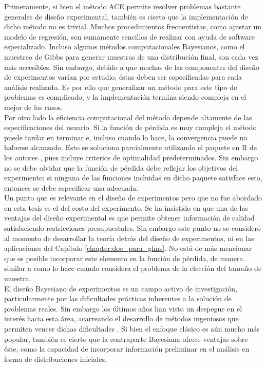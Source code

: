 Primeramente, si bien el método ACE permite resolver problemas bastante generales de diseño experimental, también es cierto que la implementación de dicho método no es trivial. Muchos procedimientos frecuentistas, como ajustar un modelo de regresión, son sumamente sencillos de realizar con ayuda de software especializado. Incluso algunos métodos computacionales Bayesianos, como el muestreo de Gibbs para generar muestras de una distribución final, son cada vez más accesibles. Sin embargo, debido a que muchas de las componentes del diseño de experimentos varían por estudio, éstas deben ser especificadas para cada análisis realizado. Es por ello que generalizar un método para este tipo de problemas es complicado, y la implementación termina siendo compleja en el mejor de los casos. \\




Por otro lado la eficiencia computacional del método depende altamente de las especificaciones del usuario. Si la función de pérdida es muy compleja el método puede tardar en terminar e, incluso cuando lo hace, la convergencia puede no haberse alcanzado. Esto se soluciona parcialmente utilizando el paquete en \textsf{R} de los autores \citep{acebayes}, pues incluye criterios de optimalidad predeterminados. Sin embargo no se debe olvidar que la función de pérdida debe reflejar los objetivos del experimento; si ninguna de las funciones incluidas en dicho paquete satisface esto, entonces se debe especificar una adecuada. \\



Un punto que es relevante en el diseño de experimentos pero que no fue abordado en esta tesis es el del costo del experimento. Se ha insistido en que una de las ventajas del diseño experimental es que permite obtener información de calidad satisfaciendo restricciones presupuestales. Sin embargo este punto no se consideró al momento de desarrollar la teoría detrás del diseño de experimentos, ni en las aplicaciones del Capítulo \ref{chapter:doe_para_glms}. No está de más mencionar que es posible incorporar este elemento en la función de pérdida, de manera similar a como lo hace \cite{bernardo_samplesize} cuando considera el problema de la elección del tamaño de muestra. \\



El diseño Bayesiano de experimentos es un campo activo de investigación, particularmente por las dificultades prácticas inherentes a la solución de problemas reales. Sin embargo los últimos años han visto un despegue en el interés hacia esta área, acarreando el desarrollo de métodos ingeniosos que permiten vencer dichas dificultades \citep{Woods_ACE,Woods_etal}. Si bien el enfoque clásico es aún mucho más popular, también es cierto que la contraparte Bayesiana ofrece ventajas sobre éste, como la capacidad de incorporar información preliminar en el análisis en forma de distribuciones iniciales. \\



